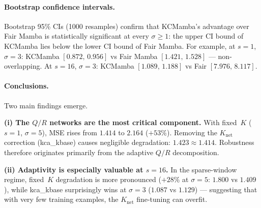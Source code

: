 \paragraph{Bootstrap confidence intervals.}
Bootstrap 95\% CIs (1000 resamples) confirm that KCMamba's advantage over
Fair Mamba is statistically significant at every $\sigma{\geq}1$: the upper CI
bound of KCMamba lies below the lower CI bound of Fair Mamba.
For example, at $s{=}1$, $\sigma{=}3$: KCMamba $[0.872,\,0.956]$ vs
Fair Mamba $[1.421,\,1.528]$ --- non-overlapping.
At $s{=}16$, $\sigma{=}3$: KCMamba $[1.089,\,1.188]$ vs Fair $[7.976,\,8.117]$.

\paragraph{Conclusions.}
Two main findings emerge.

\textbf{(i) The $Q/R$ networks are the most critical component.}
With fixed~$K$ ($s{=}1$, $\sigma{=}5$), MSE rises from $1.414$ to $2.164$ ($+53\%$).
Removing the $K_\text{net}$ correction (kca\_kbase) causes negligible degradation:
$1.423 \approx 1.414$.
Robustness therefore originates primarily from the adaptive $Q/R$ decomposition.

\textbf{(ii) Adaptivity is especially valuable at $s{=}16$.}
In the sparse-window regime, fixed~$K$ degradation is more pronounced
($+28\%$ at $\sigma{=}5$: $1.800$ vs $1.409$), while kca\_kbase
surprisingly wins at $\sigma{=}3$ ($1.087$ vs $1.129$) ---
suggesting that with very few training examples, the $K_\text{net}$
fine-tuning can overfit.
